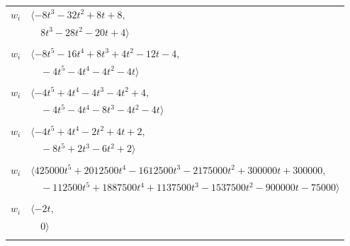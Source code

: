 \documentclass[11pt]{article}
\begin{document}
\begin{longtable}{@{}ll@{}}
$w_i$ & $\langle -8t^{3}-32t^{2}+8t+8,$\\
 & $\quad 8t^{3}-28t^{2}-20t+4\rangle$\\
\addlinespace[2pt]
\multicolumn{2}{@{}p{0.97\textwidth}@{}}{$i=5$, $D_i=2$, $\rho_{ij}$: $2{:}1, \allowbreak 4{:}2, \allowbreak 10{:}1, \allowbreak 14{:}2, \allowbreak 16{:}1, \allowbreak 18{:}1, \allowbreak 19{:}1, \allowbreak 23{:}2, \allowbreak 24{:}1, \allowbreak 25{:}1, \allowbreak 31{:}1$}\\
$w_i$ & $\langle -8t^{5}-16t^{4}+8t^{3}+4t^{2}-12t-4,$\\
 & $\quad -4t^{5}-4t^{4}-4t^{2}-4t\rangle$\\
\addlinespace[2pt]
\multicolumn{2}{@{}p{0.97\textwidth}@{}}{$i=6$, $D_i=4$, $\rho_{ij}$: $1{:}1, \allowbreak 2{:}2, \allowbreak 12{:}1, \allowbreak 17{:}2, \allowbreak 19{:}1, \allowbreak 20{:}1, \allowbreak 27{:}2, \allowbreak 30{:}2$}\\
$w_i$ & $\langle -4t^{5}+4t^{4}-4t^{3}-4t^{2}+4,$\\
 & $\quad -4t^{5}-4t^{4}-8t^{3}-4t^{2}-4t\rangle$\\
\addlinespace[2pt]
\multicolumn{2}{@{}p{0.97\textwidth}@{}}{$i=7$, $D_i=2$, $\rho_{ij}$: $2{:}1, \allowbreak 8{:}1, \allowbreak 9{:}2, \allowbreak 14{:}1, \allowbreak 16{:}2, \allowbreak 17{:}1, \allowbreak 19{:}1, \allowbreak 22{:}2, \allowbreak 25{:}1, \allowbreak 29{:}1$}\\
$w_i$ & $\langle -4t^{5}+4t^{4}-2t^{2}+4t+2,$\\
 & $\quad -8t^{5}+2t^{3}-6t^{2}+2\rangle$\\
\addlinespace[2pt]
\multicolumn{2}{@{}p{0.97\textwidth}@{}}{$i=8$, $D_i=12500$, $\rho_{ij}$: $2{:}2, \allowbreak 3{:}2, \allowbreak 7{:}2, \allowbreak 9{:}1, \allowbreak 13{:}1, \allowbreak 15{:}2, \allowbreak 17{:}2, \allowbreak 19{:}2, \allowbreak 21{:}2, \allowbreak 22{:}2, \allowbreak 29{:}1$}\\
$w_i$ & $\langle 425000t^{5}+2012500t^{4}-1612500t^{3}-2175000t^{2}+300000t+300000,$\\
 & $\quad -112500t^{5}+1887500t^{4}+1137500t^{3}-1537500t^{2}-900000t-75000\rangle$\\
\addlinespace[2pt]
\multicolumn{2}{@{}p{0.97\textwidth}@{}}{$i=9$, $D_i=2$, $\rho_{ij}$: $7{:}1, \allowbreak 8{:}2, \allowbreak 21{:}1$}\\
$w_i$ & $\langle -2t,$\\
 & $\quad 0\rangle$\\
\addlinespace[2pt]
\multicolumn{2}{@{}p{0.97\textwidth}@{}}{$i=10$, $D_i=2$, $\rho_{ij}$: $2{:}2, \allowbreak 5{:}2, \allowbreak 15{:}2, \allowbreak 27{:}1, \allowbreak 30{:}2$}\\

\end{longtable}
\end{document}
